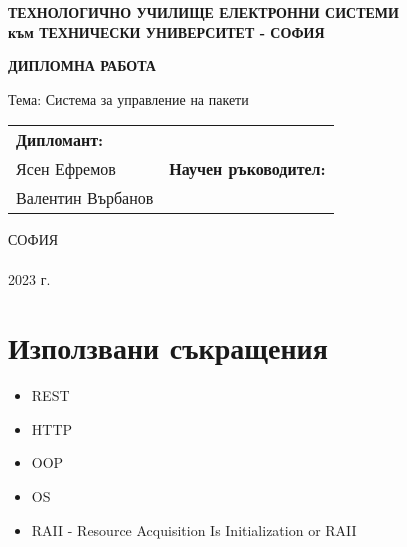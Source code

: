 \documentclass[14pt]{extreport}
\begin{document}
\begin{titlepage}
    \begin{center}
        \textbf{
            ТЕХНОЛОГИЧНО УЧИЛИЩЕ ЕЛЕКТРОННИ СИСТЕМИ \\
            към ТЕХНИЧЕСКИ УНИВЕРСИТЕТ - СОФИЯ
        }
    
        \vspace{5cm}
        \textbf{\huge ДИПЛОМНА РАБОТА}
    
        \vspace{20mm}
        {\Large Тема:
            Система за управление на пакети
        }
    
        \vspace{35mm}
        \begin{tabular}{p{8cm}p{8cm}}
            \centering
            \textbf{Дипломант:} \\
            Ясен Ефремов
            &
            \centering
            \textbf{Научен ръководител:} \\
            Валентин Върбанов
        \end{tabular}
    
        \vfill
        СОФИЯ \\
        \hfill \\
        2023 г.
    \end{center}
\end{titlepage}

\chapter*{Използвани съкращения}

\begin{itemize}
    \item REST
    \item HTTP
    \item OOP
    \item OS
    \item RAII - Resource Acquisition Is Initialization or RAII
\end{itemize}











\printbibliography

\tableofcontents
\end{document}
